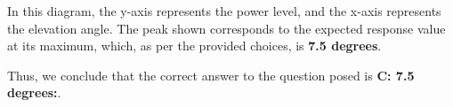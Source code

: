\begin{center}
\end{center}

In this diagram, the y-axis represents the power level, and the x-axis represents the elevation angle. The peak shown corresponds to the expected response value at its maximum, which, as per the provided choices, is \textbf{7.5 degrees}. 

Thus, we conclude that the correct answer to the question posed is \textbf{C: 7.5 degrees:}. 

